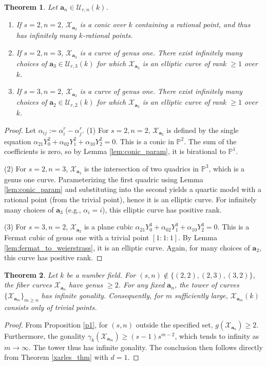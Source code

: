 \documentclass[11pt, a4paper]{amsart}
\newtheorem{thm}{Theorem}[section]
\theoremstyle{definition}
\newcommand{\Pp}{\mathbb{P}}
\newcommand{\Uc}{\mathcal{U}}
\newcommand{\Xc}{\mathcal{X}}
\newcommand{\ba}{\mathbf{a}}
\begin{document}
\begin{thm} \label{thm:low_genus_cases}
	Let $\ba_n \in \Uc_{r,n}(k)$.
	\begin{enumerate}
		\item If $s=2, n=2$, $\Xc_{\ba_2}$ is a conic over $k$ containing a rational point, and thus has infinitely many $k$-rational points.
		\item If $s=2, n=3$, $\Xc_{\ba_3}$ is a curve of genus one. There exist infinitely many choices of $\ba_3 \in \Uc_{r,3}(k)$ for which $\Xc_{\ba_3}$ is an elliptic curve of rank $\ge 1$ over $k$.
		\item If $s=3, n=2$, $\Xc_{\ba_2}$ is a curve of genus one. There exist infinitely many choices of $\ba_2 \in \Uc_{r,2}(k)$ for which $\Xc_{\ba_2}$ is an elliptic curve of rank $\ge 1$ over $k$.
	\end{enumerate}
\end{thm}
\begin{proof}
	Let $\alpha_{ij} := \alpha_i^r - \alpha_j^r$.
	(1) For $s=2, n=2$, $\Xc_{\ba_2}$ is defined by the single equation $\alpha_{21}Y_0^2+\alpha_{02}Y_1^2+\alpha_{10}Y_2^2 = 0$. This is a conic in $\Pp^2$. The sum of the coefficients is zero, so by Lemma \ref{lem:conic_param}, it is birational to $\Pp^1$.
	
	(2) For $s=2, n=3$, $\Xc_{\ba_3}$ is the intersection of two quadrics in $\Pp^3$, which is a genus one curve. Parameterizing the first quadric using Lemma \ref{lem:conic_param} and substituting into the second yields a quartic model with a rational point (from the trivial point), hence it is an elliptic curve. For infinitely many choices of $\ba_3$ (e.g., $\alpha_i = i$), this elliptic curve has positive rank.
	
	(3) For $s=3, n=2$, $\Xc_{\ba_2}$ is a plane cubic $\alpha_{21}Y_0^3+\alpha_{02}Y_1^3+\alpha_{10}Y_2^3=0$. This is a Fermat cubic of genus one with a trivial point $[1:1:1]$. By Lemma \ref{lem:fermat_to_weierstrass}, it is an elliptic curve. Again, for many choices of $\ba_2$, this curve has positive rank.
\end{proof}

\begin{thm}
	\label{thm:trivial_points_tower}
	Let $k$ be a number field. For $(s,n) \notin \{(2,2), (2,3), (3,2)\}$, the fiber curves $\Xc_{\ba_n}$ have genus $\geq 2$. For any fixed $\ba_n$, the tower of curves $\{\Xc_{\ba_m}\}_{m \ge n}$ has infinite gonality. Consequently, for $m$ sufficiently large, $\Xc_{\ba_m}(k)$ consists only of trivial points.
\end{thm}
\begin{proof}
	From Proposition \ref{p1}, for $(s,n)$ outside the specified set, $g(\Xc_{\ba_n}) \ge 2$. Furthermore, the gonality $\gamma_k(\Xc_{\ba_m}) \ge (s-1)s^{m-2}$, which tends to infinity as $m \to \infty$. The tower thus has infinite gonality. The conclusion then follows directly from Theorem \ref{xarles_thm} with $d=1$.
\end{proof}
\end{document}
